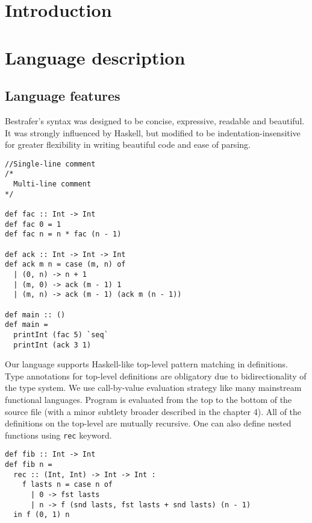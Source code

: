 \documentclass[declaration,shortabstract,english]{iithesis}
\author         {Konrad Werbliński}
\begin{document}

\chapter{Introduction}
\chapter{Language description}
\section{Language features}
Bestrafer's syntax was designed to be concise, expressive, readable and beautiful.
It was strongly influenced by Haskell, but modified to be indentation-insensitive for greater
flexibility in writing beautiful code and ease of parsing.
\begin{verbatim}
//Single-line comment
/*
  Multi-line comment
*/

def fac :: Int -> Int
def fac 0 = 1
def fac n = n * fac (n - 1)

def ack :: Int -> Int -> Int
def ack m n = case (m, n) of
  | (0, n) -> n + 1
  | (m, 0) -> ack (m - 1) 1
  | (m, n) -> ack (m - 1) (ack m (n - 1))

def main :: ()
def main =
  printInt (fac 5) `seq`
  printInt (ack 3 1)
\end{verbatim}
Our language supports Haskell-like top-level pattern matching in definitions. Type annotations
for top-level definitions are obligatory due to bidirectionality of the type system.
We use call-by-value evaluation strategy like many mainstream functional languages.
Program is evaluated from the top to the bottom of the source file
(with a minor subtlety broader described in the chapter 4). All of the definitions on the top-level
are mutually recursive. One can also define nested functions using \verb+rec+ keyword.
\begin{verbatim}
def fib :: Int -> Int
def fib n =
  rec :: (Int, Int) -> Int -> Int :
    f lasts n = case n of
      | 0 -> fst lasts
      | n -> f (snd lasts, fst lasts + snd lasts) (n - 1)
  in f (0, 1) n
\end{verbatim}
\end{document}
